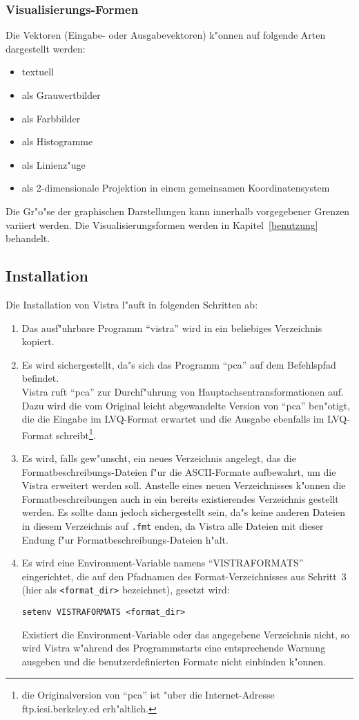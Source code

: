 \subsubsection*{Visualisierungs-Formen}

Die Vektoren (Eingabe- oder Ausgabevektoren) k"onnen auf folgende
Arten dargestellt werden:
\begin{itemize}
\item textuell
\item als Grauwertbilder
\item als Farbbilder
\item als Histogramme
\item als Linienz"uge
\item als 2-dimensionale Projektion in einem gemeinsamen Koordinatensystem
\end{itemize}

Die Gr"o"se der graphischen Darstellungen kann innerhalb vorgegebener
Grenzen variiert werden.
Die Visualisierungsformen werden in Kapitel~\ref{benutzung} behandelt.  

\subsection{Installation}

Die Installation von Vistra l"auft in folgenden Schritten ab:
\begin{enumerate}
\item Das ausf"uhrbare Programm "`vistra"' wird in ein beliebiges
Verzeichnis kopiert.
\item Es wird sichergestellt, da"s sich das Programm "`pca"' auf dem
Befehlspfad befindet. \\
Vistra ruft "`pca"' zur Durchf"uhrung von Hauptachsentransformationen auf.
Dazu wird die vom Original leicht abgewandelte Version von "`pca"' ben"otigt,
die die Eingabe im LVQ-Format erwartet und die Ausgabe ebenfalls im
LVQ-Format schreibt\footnote{die Originalversion von "`pca"'
ist "uber die Internet-Adresse ftp.icsi.berkeley.ed erh"altlich.}.
\item Es wird, falls gew"unscht, ein neues Verzeichnis angelegt, das
die Formatbeschreibungs-Dateien f"ur die ASCII-Formate aufbewahrt, 
um die Vistra erweitert werden soll.
Anstelle eines neuen Verzeichnisses k"onnen die Formatbeschreibungen auch
in ein bereits existierendes Verzeichnis gestellt werden.
Es sollte dann jedoch sichergestellt sein, da"s keine anderen Dateien in
diesem Verzeichnis auf {\tt .fmt} enden, da Vistra alle Dateien mit dieser
Endung f"ur Formatbeschreibungs-Dateien h"alt.   
\item Es wird eine Environment-Variable namens "`VISTRAFORMATS"' eingerichtet,
die auf den Pfadnamen des Format-Verzeichnisses aus Schritt~3
(hier als {\tt <format\_dir>} bezeichnet), gesetzt wird:
\begin{verbatim}
setenv VISTRAFORMATS <format_dir>
\end{verbatim} 
Existiert die Environment-Variable oder das angegebene Verzeichnis nicht,
so wird Vistra w"ahrend des Programmstarts eine entsprechende Warnung
ausgeben und die benutzerdefinierten Formate nicht einbinden k"onnen.
\end{enumerate}


